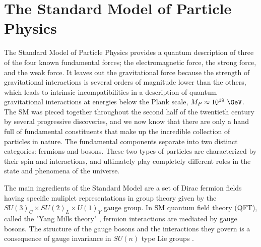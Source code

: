 \section{The Standard Model of Particle Physics}
\label{sec:sm}
The Standard Model of Particle Physics provides a quantum description of three of the four known fundamental forces; the electromagnetic force, the strong force, and the weak force.  It leaves out the gravitational force because the strength of gravitational interactions is several orders of magnitude lower than the others, which leads to intrinsic incompatibilities in a description of quantum gravitational interactions at energies below the Plank scale, $M_P\approx10^{19}~\GeV$.  The SM was pieced together throughout the second half of the twentieth century by several progressive discoveries, and we now know that there are only a hand full of fundamental constituents that make up the incredible collection of particles in nature.  The fundamental components separate into two distinct categories: fermions and bosons.  These two types of particles are characterized by their spin and interactions, and ultimately play completely different roles in the state and phenomena of the universe. \cite{tully}

The main ingredients of the Standard Model are a set of Dirac fermion fields having specific muliplet representations in group theory given by the $SU(3)_{C} \times SU(2)_{L} \times U(1)_{Y}$ gauge group.  In SM quantum field theory (QFT), called the "Yang Mills theory" \cite{PhysRev.96.191}, fermion interactions are mediated by gauge bosons.  The structure of the gauge bosons and the interactions they govern is a consequence of gauge invariance in $SU(n)$ type Lie groups \cite{westra}.  

